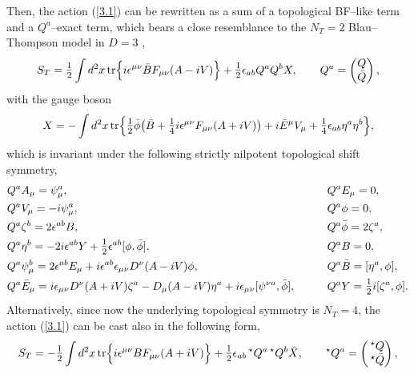 \documentclass[a4paper,11pt]{article}
\begin{document}
Then, the action (\ref{3.1}) can be rewritten as a sum of a topological 
BF--like term and a $Q^a$--exact term, which bears a close resemblance
to the $N_T = 2$ Blau--Thompson model in $D = 3$ \cite{6}, 
\begin{equation*}
S_T = \hbox{\large$\frac{1}{2}$} \int d^2x\, {\rm tr} \Bigr\{
i \epsilon^{\mu\nu} \bar{B} F_{\mu\nu}(A - i V) \Bigr\} + 
\hbox{\large$\frac{1}{2}$} \epsilon_{ab} Q^a Q^b X,
\qquad
Q^a = \begin{pmatrix} Q \\ \bar{Q} \end{pmatrix},
\end{equation*}
with the gauge boson
\begin{equation*}
X = - \int d^2x\, {\rm tr} \Bigr\{
\hbox{\large$\frac{1}{2}$} \bar{\phi} \bigr(
\bar{B} + \hbox{\large$\frac{1}{4}$} i \epsilon^{\mu\nu} 
F_{\mu\nu}(A + i V) \bigr) + i \bar{E}^\mu V_\mu +
\hbox{\large$\frac{1}{4}$} \epsilon_{ab} \eta^a \eta^b \Bigr\},
\end{equation*}
which is invariant under the following strictly nilpotent topological 
shift symmetry,
\begin{alignat}{2}
\label{3.2}
&Q^a A_\mu = \psi_\mu^a,
&\qquad
&Q^a E_\mu = 0,
\nonumber
\\
&Q^a V_\mu = - i \psi_\mu^a, 
&\qquad
&Q^a \phi = 0,
\nonumber
\\
&Q^a \zeta^b = 2 \epsilon^{ab} B,
&\qquad
&Q^a \bar{\phi} = 2 \zeta^a,
\nonumber
\\
&Q^a \eta^b = - 2 i \epsilon^{ab} Y +
\hbox{\large$\frac{1}{2}$} \epsilon^{ab} [ \phi, \bar{\phi} ],
&\qquad
&Q^a B = 0,
\nonumber
\\
&Q^a \psi_\mu^b = 2 \epsilon^{ab} E_\mu +
i \epsilon^{ab} \epsilon_{\mu\nu} D^\nu(A - i V) \phi,
&\qquad
&Q^a \bar{B} = [ \eta^a, \phi ],
\nonumber
\\
&Q^a \bar{E}_\mu = i \epsilon_{\mu\nu} D^\nu(A + i V) \zeta^a -
D_\mu(A - i V) \eta^a + i \epsilon_{\mu\nu} [ \psi^{\nu a}, \bar{\phi} ],
&\qquad
&Q^a Y = \hbox{\large$\frac{1}{2}$} i [ \zeta^a, \phi ].
\end{alignat}
Alternatively, since now the underlying topological symmetry is $N_T = 4$,
the action (\ref{3.1}) can be cast also in the following form,
\begin{equation*}
S_T = - \hbox{\large$\frac{1}{2}$} \int d^2x\, {\rm tr} \Bigr\{
i \epsilon^{\mu\nu} B F_{\mu\nu}(A + i V) \Bigr\} + 
\hbox{\large$\frac{1}{2}$} \epsilon_{ab} \,^\star Q^a \,^\star Q^b \bar{X},
\qquad
^\star Q^a = \begin{pmatrix} \,^\star Q \\ \,^\star \bar{Q} \end{pmatrix},
\end{equation*}
\end{document}
